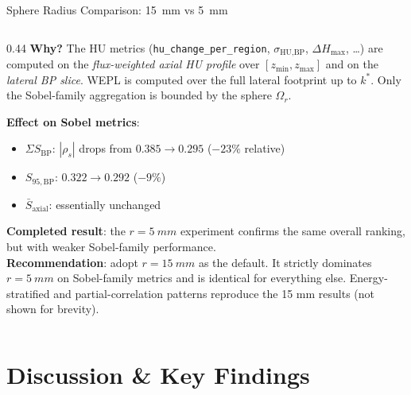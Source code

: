 \documentclass[aspectratio=169, 10pt]{beamer}
\begin{document}
\begin{frame}[shrink=5]{Sphere Radius Comparison: \SI{15}{mm} vs \SI{5}{mm}}
\begin{columns}[T]
\begin{column}{0.44\textwidth}
      \vspace{4pt}
      \textbf{Why?} The HU metrics
      (\texttt{hu\_change\_per\_region}, $\sigma_{\text{HU,BP}}$,
      $\Delta H_{\max}$, …) are computed on the
      \emph{flux-weighted axial HU profile} over $[z_{\min}, z_{\max}]$
      and on the \emph{lateral BP slice}.  WEPL is computed over the
      full lateral footprint up to $k^*$.  Only the
      Sobel-family aggregation is bounded by the sphere $\Omega_r$.

      \vspace{4pt}
      \textbf{Effect on Sobel metrics}:
      \begin{itemize}\setlength{\itemsep}{0pt}
        \item $\Sigma S_{\text{BP}}$: $|\rho_s|$ drops from
              $0.385 \to 0.295$ ($-23\%$ relative)
        \item $S_{95,\text{BP}}$: $0.322 \to 0.292$ ($-9\%$)
        \item $\bar{S}_{\text{axial}}$: essentially unchanged
      \end{itemize}

      \vspace{4pt}
      \textbf{Completed result}: the $r = \SI{5}{mm}$ experiment confirms
      the same overall ranking, but with weaker Sobel-family performance.\\[4pt]

      \textbf{Recommendation}: adopt \textbf{$r = \SI{15}{mm}$} as
      the default. It strictly dominates $r = \SI{5}{mm}$ on
      Sobel-family metrics and is identical for everything else.
      Energy-stratified and partial-correlation patterns
      reproduce the 15 mm results (not shown for brevity).
    \end{column}
  \end{columns}
\end{frame}

\section{Discussion \& Key Findings}
\end{document}
